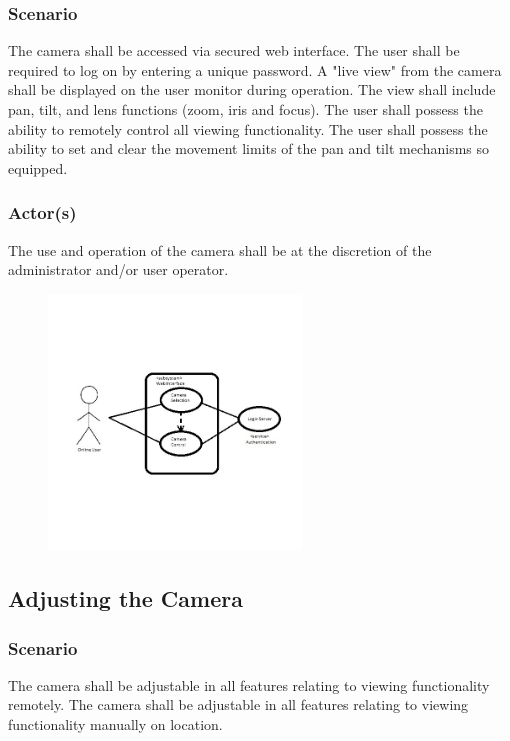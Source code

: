 \subsubsection{Scenario}
The camera shall be accessed via secured web interface.
The user shall be required to log on by entering a unique password.
A "live view" from the camera shall be displayed on the user monitor during operation. 
The view shall include pan, tilt, and lens functions (zoom, iris and focus). 
The user shall possess the ability to remotely control all viewing functionality.
The user shall possess the ability to set and clear the movement limits of the pan and tilt mechanisms so equipped.

\subsubsection{Actor(s)}
The use and operation of the camera shall be at the discretion of the administrator and/or user operator.
\vspace{0.5 in}
\begin{figure}[h!]
	\centering
   	\includegraphics[width=0.60\textwidth]{images/camera_operation_UML}
\end{figure}
\vspace{0.5 in}
\subsection{Adjusting the Camera}

\subsubsection{Scenario}
The camera shall be adjustable in all features relating to viewing functionality remotely.
The camera shall be adjustable in all features relating to viewing functionality manually on location.

